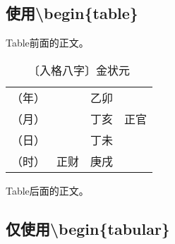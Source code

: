 \documentclass[a5paper,oneside,12pt]{ctexbook}
\begin{document}
\subsection{使用{\textbackslash}begin{\{table\}}}
Table前面的正文。

\begin{table}[H] %
\setlength{\abovecaptionskip}{0em} %
\captionsetup{labelformat=empty,justification=raggedright,singlelinecheck=false,indention=2em} %
\caption{〔入格八字〕金状元}
\setlength{\tabcolsep}{0em} %
\begin{tabular}{|m{5em}<{\raggedleft}|m{2.5em}<{\raggedleft}|c|c|} %
\hline
（年）&&乙卯&\\
（月）&&丁亥&\scriptsize{正官}\\
（日）&&丁未&\\
（时）&\scriptsize{正财}&庚戌&\\
\hline
\end{tabular}
\end{table}
Table后面的正文。


\subsection{仅使用{\textbackslash}begin{\{tabular\}}}
\end{document}
